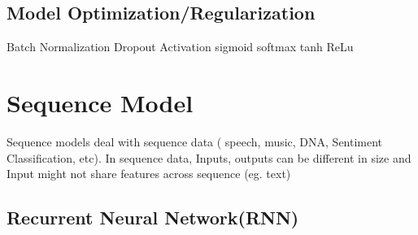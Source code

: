 \documentclass[11pt, openany]{book}              %
\begin{document}
\section{Model Optimization/Regularization}
		Batch Normalization
		Dropout
		Activation
			sigmoid
			softmax
			tanh
			ReLu


\chapter{Sequence Model}

Sequence models deal with sequence data ( speech, music, DNA, Sentiment Classification, etc). In sequence data, Inputs, outputs can be different in size and Input might not share features across sequence (eg. text)

\section{Recurrent Neural Network(RNN)}
\end{document}
